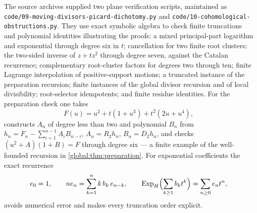 \documentclass[11pt,letterpaper]{article}
\theoremstyle{definition}
\theoremstyle{remark}
\newcommand{\ExpH}{\operatorname{Exp}_{H}}
\numberwithin{equation}{section}
\begin{document}
The source archives supplied two plane verification scripts, maintained as \nolinkurl{code/09-moving-divisors-picard-dichotomy.py} and \nolinkurl{code/10-cohomological-obstructions.py}. They use exact symbolic algebra to check finite truncations and polynomial identities illustrating the proofs: a mixed principal-part logarithm and exponential through degree six in $t$; cancellation for two finite root clusters; the two-sided inverse of $z+tz^2$ through degree seven, against the Catalan recurrence; complementary root-cluster factors for degrees two through ten; finite Lagrange interpolation of positive-support motions; a truncated instance of the preparation recursion; finite instances of the global divisor recursion and of local divisibility; root-selector idempotents; and finite residue identities. For the preparation check one takes
\[
  F(u)=u^2+t(1+u^3)+t^2(2u+u^4),
\]
constructs $A_n$ of degree less than two and polynomial $B_n$ from $h_n=F_n-\sum_{i=1}^{n-1}A_iB_{n-i}$, $A_n=R_2h_n$, $B_n=D_2h_n$, and checks $(u^2+A)(1+B)=F$ through degree six --- a finite example of the well-founded recursion in \cref{global:thm:preparation}. For exponential coefficients the exact recurrence
\[
  e_0=1,\qquad n e_n=\sum_{k=1}^{n}k\,b_k\,e_{n-k},
  \qquad \ExpH\Bigl(\sum_{k\ge1}b_kt^k\Bigr)=\sum_{n\ge0}e_nt^n,
\]
avoids numerical error and makes every truncation order explicit.
\end{document}
